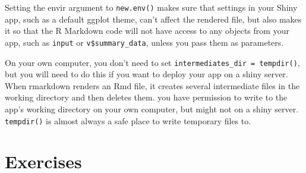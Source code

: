 \documentclass[
  oneside]{book}
\newenvironment{Shaded}{\begin{snugshade}}{\end{snugshade}}
\newcommand{\AttributeTok}[1]{\textcolor[rgb]{0.77,0.63,0.00}{#1}}
\newcommand{\ControlFlowTok}[1]{\textcolor[rgb]{0.13,0.29,0.53}{\textbf{#1}}}
\newcommand{\DocumentationTok}[1]{\textcolor[rgb]{0.56,0.35,0.01}{\textbf{\textit{#1}}}}
\newcommand{\FunctionTok}[1]{\textcolor[rgb]{0.00,0.00,0.00}{#1}}
\newcommand{\NormalTok}[1]{#1}
\newcommand{\OtherTok}[1]{\textcolor[rgb]{0.56,0.35,0.01}{#1}}
\newcommand{\SpecialCharTok}[1]{\textcolor[rgb]{0.00,0.00,0.00}{#1}}
\newcommand{\StringTok}[1]{\textcolor[rgb]{0.31,0.60,0.02}{#1}}
\begin{document}
\begin{Shaded}
\end{Shaded}

Setting the \AttributeTok{envir} argument to \texttt{new.env}\texttt{()} makes sure that settings in your Shiny app, such as a default ggplot theme, can't affect the rendered file, but also makes it so that the R Markdown code will not have access to any objects from your app, such as \texttt{input} or \texttt{v\$summary\_data}, unless you pass them as parameters.

\begin{dangerous}
On your own computer, you don't need to set \texttt{intermediates\_dir\ =\ tempdir()}, but you will need to do this if you want to deploy your app on a shiny server. When rmarkdown renders an Rmd file, it creates several intermediate files in the working directory and then deletes them. you have permission to write to the app's working directory on your own computer, but might not on a shiny server. \texttt{tempdir}\texttt{()} is almost always a safe place to write temporary files to.

\end{dangerous}

\hypertarget{exercises-reports}{%
\section{Exercises}\label{exercises-reports}}
\end{document}

